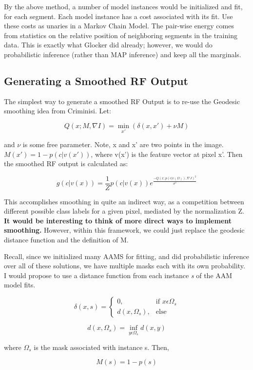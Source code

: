 \documentclass[10pt,twocolumn,letterpaper]{article}
\begin{document}
By the above method, a number of model instances would be initialized and fit, for each segment.  Each model instance has a cost associated with its fit.  Use these costs as unaries in a Markov Chain Model.  The pair-wise energy comes from statistics on the relative position of neighboring segments in the training data.  This is exactly what Glocker did already; however, we would do probabilistic inference (rather than MAP inference) and keep all the marginals.

\subsection{Generating a Smoothed RF Output}

The simplest way to generate a smoothed RF Output is to re-use the Geodesic smoothing idea from Criminisi.  Let:

\[ Q(x; M, \nabla I) = \min_{x'} (\delta (x,x') + \nu M) \]

and $\nu$ is some free parameter.  Note, x and x' are two points in the image. $M(x') = 1 - p(c|v(x'))$, where v(x') is the feature vector at pixel x'.  Then the smoothed RF output is calculated as:

\[ g(c|v(x)) = \frac{1}{Z} p(c|v(x)) e^{\frac{-Q(x;p(c|v(\Omega)),\nabla J)^2}{\sigma ^2}} \]

This accomplishes smoothing in quite an indirect way, as a competition between different possible class labels for a given pixel, mediated by the normalization Z.  \textbf{It would be interesting to think of more direct ways to implement smoothing.}  However, within this framework, we could just replace the geodesic distance function and the definition of M.

Recall, since we initialized many AAMS for fitting, and did probabilistic inference over all of these solutions, we have multiple masks each with its own probability.  I would propose to use a distance function from each instance \emph{s} of the AAM model fits.

\[ \delta (x,s) = \begin{cases} 0, & \mbox{if } x \epsilon \Omega _s \\ d(x, \Omega _s), & \mbox{else} \end{cases} \]

\[ d(x,\Omega _s) = \inf_{y \epsilon \Omega _s} d(x,y) \]

where $\Omega _s$ is the mask associated with instance s.  Then, 

\[ M(s) = 1 - p(s) \] 
\end{document}

